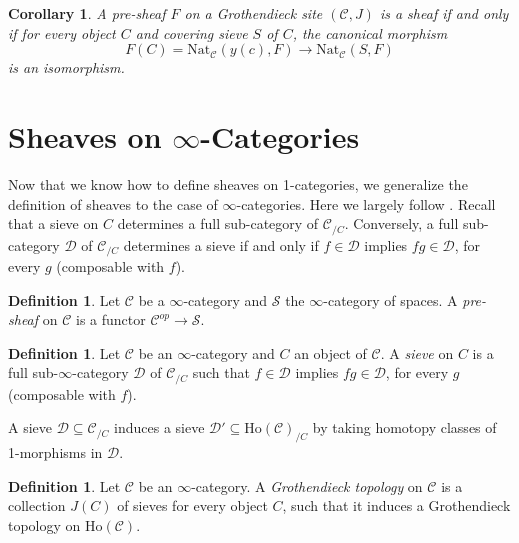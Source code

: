 \documentclass[10pt]{amsart}
\newcommand{\C}{\mathscr{C}}
\newcommand{\D}{\mathscr{D}}
\newcommand{\s}{\mathscr{S}}
\newcommand{\Ho}{\mathrm{Ho}}
\newcommand{\Nat}{\mathrm{Nat}}
\newtheorem{corollary}[equation]{Corollary}
\theoremstyle{definition}
\newtheorem{definition}[equation]{Definition}
\theoremstyle{remark}
\numberwithin{equation}{section}
\begin{document}
	\begin{corollary}
		A pre-sheaf $F$ on a Grothendieck site $(\C, J)$ is a sheaf if and only if for every object $C$ and covering sieve $S$ of $C$, the canonical morphism
		\[ F(C)  = \Nat_\C(y(c),F)\to \Nat_\C(S,F) \]
		is an isomorphism. 
	\end{corollary}
	
	\section{Sheaves on \texorpdfstring{$\infty$}{oo}-Categories}
	Now that we know how  to define sheaves on 1-categories, we generalize the definition of sheaves to the case of $\infty$-categories. Here we largely follow \cite{lurie2009htt}. Recall that a sieve on $C$ determines a full sub-category of $\C_{/C}$. Conversely, a full sub-category $\D$ of $\C_{/C}$ determines a sieve if and only if $f\in\D$ implies $fg\in\D$, for every $g$ (composable with $f$). 
	\begin{definition}
		Let $\C$ be a $\infty$-category and $\s$ the $\infty$-category of spaces. A \textit{pre-sheaf} on $\C$ is a functor $\C^{op}\to\s$.
	\end{definition}
	\begin{definition}
		Let $\C$ be an $\infty$-category and $C$ an object of $\C$. A \textit{sieve} on $C$ is a full sub-$\infty$-category $\D$ of $\C_{/C}$ such that $f\in\D$ implies $fg\in\D$, for every $g$ (composable with $f$).  
	\end{definition}
	A sieve $\D\subseteq\C_{/C}$ induces a sieve $\D'\subseteq\Ho(\C)_{/C}$ by taking homotopy classes of 1-morphisms in $\D$. 
	\begin{definition}
		Let $\C$ be an $\infty$-category. A \emph{Grothendieck topology} on $\C$ is a collection $J(C)$ of sieves for every object $C$, such that it induces a Grothendieck topology on $\Ho(\C)$. 
	\end{definition}
	
\end{document}
